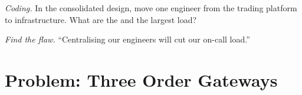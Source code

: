 \begin{exercise}[$\star\star\star$]\label{exo:fm:engineering-organisation-design:7}
\emph{Coding.} In the consolidated design, move one engineer from the trading platform to infrastructure. What are the  and the largest
load?
\end{exercise}

\begin{exercise}[$\star\star\star$]\label{exo:fm:engineering-organisation-design:8}
\emph{Find the flaw.} ``Centralising our engineers will cut our on-call load.''
\end{exercise}

\section{Problem: Three Order Gateways}

